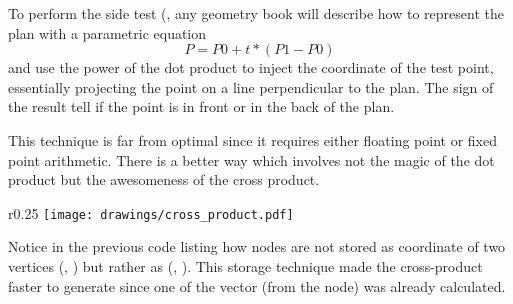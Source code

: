 To perform the side test (, any geometry book will describe how to represent the plan with a parametric equation $$ P = P0 + t * (P1 - P0) $$
and use the power of the dot product to inject the coordinate of the test point, essentially projecting the point on a line perpendicular to the plan. The sign of the result tell if the point is in front or in the back of the plan.\\
\par
This technique is far from optimal since it requires either floating point or fixed point arithmetic. There is a better way which involves not the magic of the dot product but the awesomeness of the cross product.\\
\par
{}
\pagebreak


\begin{wrapfigure}[8]{r}{0.25\textwidth}
\centering
\texttt{[image: drawings/cross\_product.pdf]}
\end{wrapfigure}
Notice in the previous code listing how nodes are not stored as coordinate of two vertices (, ) but rather as (, ). This storage technique made the cross-product faster to generate since one of the vector (from the node) was already calculated.\\
\par


